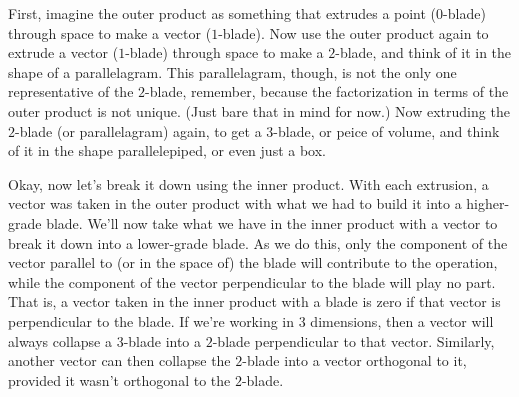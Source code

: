 \documentclass[12pt]{article}
\begin{document}
First, imagine the outer product as something that extrudes a point ($0$-blade) through
space to make a vector ($1$-blade).  Now use the outer product again to extrude a vector
($1$-blade) through space to make a $2$-blade, and think of it in the shape of a parallelagram.
This parallelagram, though, is not the only one representative of the $2$-blade, remember,
because the factorization in terms of the outer product is not unique.  (Just bare that in mind for now.)
Now extruding the $2$-blade (or parallelagram) again, to get a $3$-blade, or peice of volume,
and think of it in the shape parallelepiped, or even just a box.

Okay, now let's break it down using the inner product.  With each extrusion, a vector was
taken in the outer product with what we had to build it into a higher-grade blade.  We'll now
take what we have in the inner product with a vector to break it down into a lower-grade blade.
As we do this, only the component of the vector parallel to (or in the space of) the blade
will contribute to the operation, while the component of the vector perpendicular to the blade
will play no part.  That is, a vector taken in the inner product with a blade is zero if that vector
is perpendicular to the blade.  If we're working in 3 dimensions, then a vector will always collapse
a $3$-blade into a $2$-blade perpendicular to that vector.  Similarly, another vector can then
collapse the $2$-blade into a vector orthogonal to it, provided it wasn't orthogonal to the $2$-blade.
\end{document}
